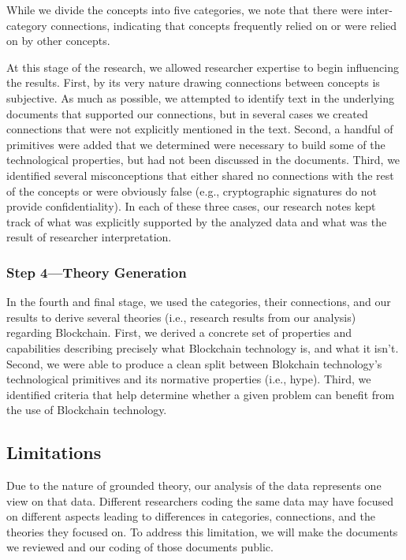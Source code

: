 While we divide the concepts into five categories, we note that there were inter-category connections, indicating that concepts frequently relied on or were relied on by other concepts.

At this stage of the research, we allowed researcher expertise to begin influencing the results.
First, by its very nature drawing connections between concepts is subjective.
As much as possible, we attempted to identify text in the underlying documents that supported our connections, but in several cases we created connections that were not explicitly mentioned in the text.
Second, a handful of primitives were added that we determined were necessary to build some of the technological properties, but had not been discussed in the documents.
Third, we identified several misconceptions that either shared no connections with the rest of the concepts or were obviously false (e.g., cryptographic signatures do not provide confidentiality).
In each of these three cases, our research notes kept track of what was explicitly supported by the analyzed data and what was the result of researcher interpretation.

\subsubsection{Step 4---Theory Generation}
In the fourth and final stage, we used the categories, their connections, and our results to derive several theories (i.e., research results from our analysis) regarding Blockchain.
First, we derived a concrete set of properties and capabilities describing precisely what Blockchain technology is, and what it isn't.
Second, we were able to produce a clean split between Blokchain technology's technological primitives and its normative properties (i.e., hype).
Third, we identified criteria that help determine whether a given problem can benefit from the use of Blockchain technology.

\subsection{Limitations}
Due to the nature of grounded theory, our analysis of the data represents one view on that data.
Different researchers coding the same data may have focused on different aspects leading to differences in categories, connections, and the theories they focused on.
To address this limitation, we will make the documents we reviewed and our coding of those documents public.